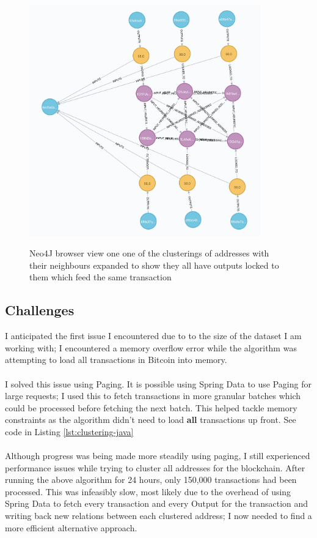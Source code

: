 \begin{figure}[h!]
  \centering
  \includegraphics[width = 10cm]{./figures/input-one-tx-heuristic-1}\\[0.5cm] 
  \caption{Neo4J browser view one one of the clusterings of addresses with their neighbours expanded to show they all have outputs locked to them which feed the same transaction}
  \label{fig:neo4j-1-tx-heuristic-1-cluster}
\end{figure}


\subsection{Challenges}

I anticipated the first issue I encountered due to to the size of the dataset I am working with; I encountered a memory overflow error while the algorithm was attempting to load all transactions in Bitcoin into memory. 
\\\\
I solved this issue using Paging. It is possible using Spring Data to use Paging for large requests; I used this to fetch transactions in more granular batches which could be processed before fetching the next batch. This helped tackle memory constraints as the algorithm didn't need to load \textbf{all} transactions up front. See code in Listing \ref{lst:clustering-java}
\\\\
Although progress was being made more steadily using paging, I still experienced performance issues while trying to cluster all addresses for the blockchain. After running the above algorithm for 24 hours, only 150,000 transactions had been processed. This was infeasibly slow, most likely due to the overhead of using Spring Data to fetch every transaction and every Output for the transaction and writing back new relations between each clustered address; I now needed to find a more efficient alternative approach. 
\\\\

